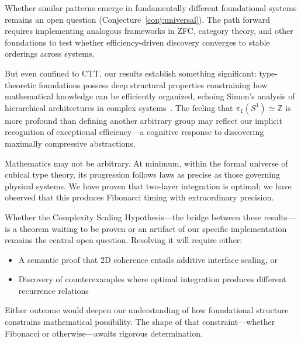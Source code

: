 \documentclass[11pt]{article}
\theoremstyle{definition}
\theoremstyle{plain}
\theoremstyle{remark}
\begin{document}
Whether similar patterns emerge in fundamentally different foundational systems remains an open question (Conjecture~\ref{conj:universal}). The path forward requires implementing analogous frameworks in ZFC, category theory, and other foundations to test whether efficiency-driven discovery converges to stable orderings across systems.

But even confined to CTT, our results establish something significant: type-theoretic foundations possess deep structural properties constraining how mathematical knowledge can be efficiently organized, echoing Simon's analysis of hierarchical architectures in complex systems~\cite{simon-architecture}. The feeling that $\pi_1(S^1) \simeq \mathbb{Z}$ is more profound than defining another arbitrary group may reflect our implicit recognition of exceptional efficiency—a cognitive response to discovering maximally compressive abstractions.

Mathematics may not be arbitrary. At minimum, within the formal universe of 
cubical type theory, its progression follows laws as precise as those governing 
physical systems. We have proven that two-layer integration is optimal; we have 
observed that this produces Fibonacci timing with extraordinary precision. 

Whether the Complexity Scaling Hypothesis—the bridge between these results—is 
a theorem waiting to be proven or an artifact of our specific implementation 
remains the central open question. Resolving it will require either:
\begin{itemize}
\item A semantic proof that 2D coherence entails additive interface scaling, or
\item Discovery of counterexamples where optimal integration produces different 
recurrence relations
\end{itemize}

Either outcome would deepen our understanding of how foundational structure 
constrains mathematical possibility. The shape of that constraint—whether 
Fibonacci or otherwise—awaits rigorous determination.
\end{document}
